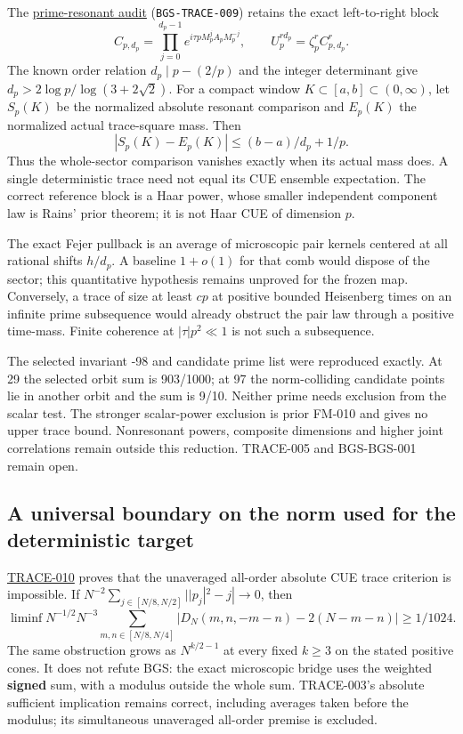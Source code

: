 The \href{https://github.com/ChurilovMaksim/BGS/blob/main/mathematics/prime_resonant_sector.md}{prime-resonant audit} (\texttt{BGS-TRACE-009})
retains the exact left-to-right block
\[
C_{p,d_p}=\prod_{j=0}^{d_p-1}e^{i\tau p M_p^jA_pM_p^{-j}},\qquad
U_p^{rd_p}=\zeta_p^r C_{p,d_p}^r.
\]
The known order relation \(d_p\mid p-(2/p)\) and the integer determinant
give \(d_p>2\log p/\log(3+2\sqrt2)\). For a compact window
\(K\subset[a,b]\subset(0,\infty)\), let \(S_p(K)\) be the normalized
absolute resonant comparison and \(E_p(K)\) the normalized actual
trace-square mass. Then
\[
|S_p(K)-E_p(K)|\le(b-a)/d_p+1/p.
\]
Thus the whole-sector comparison vanishes exactly when its actual
mass does. A single deterministic trace need not equal its CUE ensemble
expectation. The correct reference block is a Haar power, whose smaller
independent component law is Rains' prior theorem; it is not Haar CUE
of dimension \(p\).

The exact Fejer pullback is an average of microscopic pair kernels
centered at all rational shifts \(h/d_p\). A baseline \(1+o(1)\) for that
comb would dispose of the sector; this quantitative hypothesis remains
unproved for the frozen map. Conversely, a trace of size at least \(cp\)
at positive bounded Heisenberg times on an infinite prime subsequence
would already obstruct the pair law through a positive time-mass.
Finite coherence at \(|\tau|p^2\ll1\) is not such a subsequence.

The selected invariant -98 and candidate prime list were reproduced
exactly. At 29 the selected orbit sum is 903/1000; at 97 the norm-colliding
candidate points lie in another orbit and the sum is 9/10. Neither
prime needs exclusion from the scalar test. The stronger scalar-power
exclusion is prior FM-010 and gives no upper trace bound.
Nonresonant powers, composite dimensions and higher joint correlations
remain outside this reduction. TRACE-005 and BGS-BGS-001 remain open.

\hypertarget{a-universal-boundary-on-the-norm-used-for-the-deterministic-target}{%
\subsection{A universal boundary on the norm used for the deterministic target}\label{a-universal-boundary-on-the-norm-used-for-the-deterministic-target}}

\href{https://github.com/ChurilovMaksim/BGS/blob/main/mathematics/signed_heisenberg_comparison.md}{TRACE-010} proves that the unaveraged
all-order absolute CUE trace criterion is impossible. If
\(N^{-2}\sum_{j\in[N/8,N/2]}||p_j|^2-j|\to0\), then
\[
\liminf N^{-1/2}N^{-3}\sum_{m,n\in[N/8,N/4]}
|D_N(m,n,-m-n)-2(N-m-n)|\ge1/1024.
\]
The same obstruction grows as \(N^{k/2-1}\) at every fixed \(k\ge3\)
on the stated positive cones. It does not refute BGS: the exact
microscopic bridge uses the weighted \textbf{signed} sum, with a modulus
outside the whole sum. TRACE-003's absolute sufficient implication
remains correct, including averages taken before the modulus; its
simultaneous unaveraged all-order premise is excluded.

